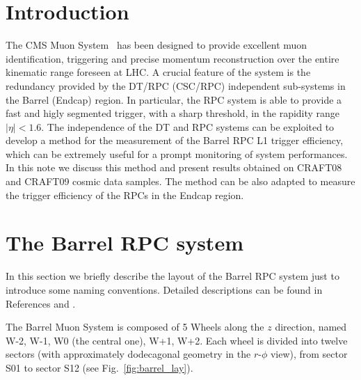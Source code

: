 \maketitle %

\section{Introduction}
The CMS Muon System~\cite{ref:mutdr}\cite{ref:jinst} has 
been designed to provide excellent muon
identification, triggering and precise momentum reconstruction 
over the entire kinematic range foreseen at LHC. A crucial
feature of the system is the redundancy provided by the DT/RPC 
(CSC/RPC) independent sub-systems in the Barrel (Endcap) region.
In particular, the RPC system is able to provide 
a fast and higly segmented trigger, with a 
sharp \pt threshold, in the rapidity range $|\eta| < 1.6$.
The independence of the DT and RPC systems can be exploited
to develop a method for the measurement of the Barrel RPC L1 
trigger efficiency, which can be extremely useful 
for a prompt monitoring of system performances.
In this note we discuss this method and present results
obtained on CRAFT08 and CRAFT09 cosmic data samples.
The method can be also adapted to measure the 
trigger efficiency of the RPCs in the Endcap region.

\section{The Barrel RPC system}
In this section we briefly describe the layout of the
Barrel RPC system just to introduce some
naming conventions. Detailed descriptions
can be found in References \cite{ref:mutdr}
and \cite{ref:jinst}.

The Barrel Muon System is composed of 5 Wheels along 
the $z$ direction, named W-2, W-1, W0 (the central one), 
W+1, W+2. Each wheel is divided into twelve 
sectors (with approximately dodecagonal geometry in the 
$r$-$\phi$ view), from sector S01 to sector S12 
(see Fig.~\ref{fig:barrel_lay}).

